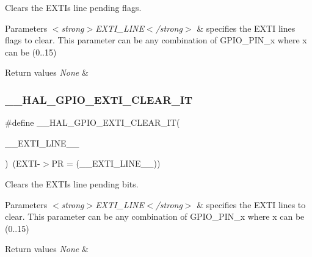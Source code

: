 Clears the E\+X\+TI\textquotesingle{}s line pending flags. 


\begin{DoxyParams}{Parameters}
{\em $<$strong$>$\+E\+X\+T\+I\+\_\+\+L\+I\+N\+E$<$/strong$>$} & specifies the E\+X\+TI lines flags to clear. This parameter can be any combination of G\+P\+I\+O\+\_\+\+P\+I\+N\+\_\+x where x can be (0..15) \\
\hline
\end{DoxyParams}

\begin{DoxyRetVals}{Return values}
{\em None} & \\
\hline
\end{DoxyRetVals}
\mbox{\label{group___g_p_i_o___exported___macros_ga2a086506eec826f49b200fba64beb9f1}} 
\subsubsection{\texorpdfstring{\_\_HAL\_GPIO\_EXTI\_CLEAR\_IT}{\_\_HAL\_GPIO\_EXTI\_CLEAR\_IT}}
{\footnotesize\ttfamily \#define \+\_\+\+\_\+\+H\+A\+L\+\_\+\+G\+P\+I\+O\+\_\+\+E\+X\+T\+I\+\_\+\+C\+L\+E\+A\+R\+\_\+\+IT(\begin{DoxyParamCaption}\item[{}]{\+\_\+\+\_\+\+E\+X\+T\+I\+\_\+\+L\+I\+N\+E\+\_\+\+\_\+ }\end{DoxyParamCaption})~(E\+X\+TI-\/$>$PR = (\+\_\+\+\_\+\+E\+X\+T\+I\+\_\+\+L\+I\+N\+E\+\_\+\+\_\+))}



Clears the E\+X\+TI\textquotesingle{}s line pending bits. 


\begin{DoxyParams}{Parameters}
{\em $<$strong$>$\+E\+X\+T\+I\+\_\+\+L\+I\+N\+E$<$/strong$>$} & specifies the E\+X\+TI lines to clear. This parameter can be any combination of G\+P\+I\+O\+\_\+\+P\+I\+N\+\_\+x where x can be (0..15) \\
\hline
\end{DoxyParams}

\begin{DoxyRetVals}{Return values}
{\em None} & \\
\hline
\end{DoxyRetVals}
\mbox{\label{group___g_p_i_o___exported___macros_gac50aef6881e1f76032941ead9c9bce61}} 
